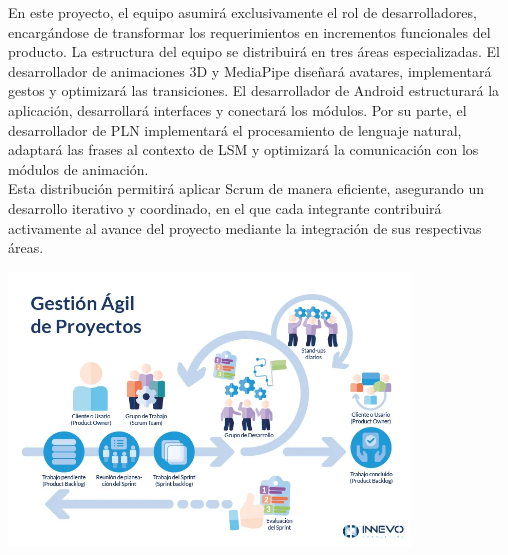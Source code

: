 En este proyecto, el equipo asumirá exclusivamente el rol de desarrolladores, encargándose de transformar los requerimientos en incrementos funcionales del producto. La estructura del equipo se distribuirá en tres áreas especializadas. El desarrollador de animaciones 3D y MediaPipe diseñará avatares, implementará gestos y optimizará las transiciones. El desarrollador de Android estructurará la aplicación, desarrollará interfaces y conectará los módulos. Por su parte, el desarrollador de PLN implementará el procesamiento de lenguaje natural, adaptará las frases al contexto de LSM y optimizará la comunicación con los módulos de animación.\\

Esta distribución permitirá aplicar Scrum de manera eficiente, asegurando un desarrollo iterativo y coordinado, en el que cada integrante contribuirá activamente al avance del proyecto mediante la integración de sus respectivas áreas.


\begin{center}
    \includegraphics[width=0.8\textwidth]{Images/Cap 1/metoscrum.jpg}
\end{center}
